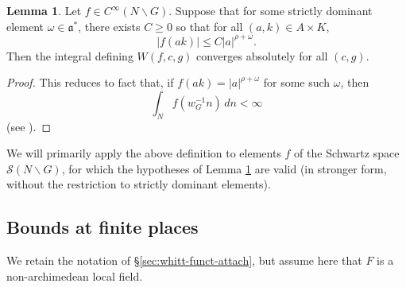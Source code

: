 \documentclass[reqno]{amsart}
\theoremstyle{plain} \newtheorem{theorem} {Theorem}
\theoremstyle{definition} \newtheorem{definition} [theorem] {Definition}
\theoremstyle{itplain} %
\newtheorem{lemma}[theorem]{Lemma}
\numberwithin{equation}{section}
\numberwithin{theorem}{section}
\renewcommand{\geq}{\geqslant}
\renewcommand{\leq}{\leqslant}
\begin{document}
\begin{lemma}\label{lem:standard2:let-f-in}
  Let $f \in C^\infty(N \backslash G)$.  Suppose that for some strictly dominant element $\omega \in \mathfrak{a}^*$, there exists $C \geq 0$ so that for all $(a,k) \in A \times K$,
  \begin{equation}\label{eq:fa-k-leq}
    |f(a k)| \leq C |a|^{\rho + \omega}.
  \end{equation}
  Then the integral defining $W(f,c,g)$ converges absolutely  for all $(c,g)$.
\end{lemma}
\begin{proof}
  This reduces to fact that, if $f(a k) = |a|^{\rho + \omega}$ for some such $\omega$, then
  \begin{equation*}
    \int_{N} f(w^{-1}_G n) \, d n< \infty
  \end{equation*}
  (see \cite[\S10.1.2]{MR1170566}).
\end{proof}
We will primarily apply the above definition to elements $f$ of the Schwartz space $\mathcal{S}(N \backslash G)$, for which the hypotheses of Lemma \ref{lem:standard2:let-f-in} are valid (in stronger form, without the restriction to strictly dominant elements).


\subsection{Bounds at finite places}
We retain the notation of \S\ref{sec:whitt-funct-attach}, but assume here that $F$ is a non-archimedean local field.
\end{document}
